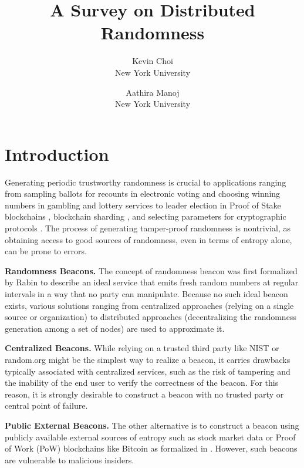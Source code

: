 \documentclass[letterpaper,twocolumn,10pt]{article}
\title{\Large \bf A Survey on Distributed Randomness}
\author{
{\rm Kevin Choi}\\
New York University
\and
{\rm Aathira Manoj}\\
New York University
}
\theoremstyle{definition}
\theoremstyle{remark}
\begin{document}
\maketitle
\tableofcontents

\section{Introduction}
Generating periodic trustworthy randomness is crucial to applications ranging from sampling ballots for recounts in electronic voting \cite{adida2008helios} and choosing winning numbers in gambling and lottery services \cite{bonneau2015bitcoin} to leader election in Proof of Stake blockchains \cite{gilad2017algorand, kiayias2017ouroboros}, blockchain sharding \cite{al2017chainspace, kokoris2018omniledger, luu2016secure}, and selecting parameters for cryptographic protocols \cite{baigneres2015trap, lenstra2015random}. The process of generating tamper-proof randomness is nontrivial, as obtaining access to good sources of randomness, even in terms of entropy alone, can be prone to errors.

\textbf{Randomness Beacons.} The concept of randomness beacon was first formalized by Rabin \cite{rabin1983Rabin} to describe an ideal service that emits fresh random numbers at regular intervals in a way that no party can manipulate. Because no such ideal beacon exists, various solutions ranging from centralized approaches (relying on a single source or organization) to distributed approaches (decentralizing the randomness generation among a set of nodes) are used to approximate it.

\textbf{Centralized Beacons.} While relying on a trusted third party like NIST \cite{fischer2011public} or random.org \cite{haahr2010random} might be the simplest way to realize a beacon, it carries drawbacks typically associated with centralized services, such as the risk of tampering and the inability of the end user to verify the correctness of the beacon. For this reason, it is strongly desirable to construct a beacon with no trusted party or central point of failure.

\textbf{Public External Beacons.} The other alternative is to construct a beacon using publicly available external sources of entropy such as stock market data \cite{clark2010use} or Proof of Work (PoW) blockchains like Bitcoin \cite{nakamoto2008bitcoin, bentov2016bitcoin, han2020randchain} as formalized in \cite{bonneau2015bitcoin}. However, such beacons are vulnerable to malicious insiders.
\end{document}
